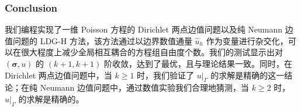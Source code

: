 \subsubsection{Conclusion}

我们编程实现了一维 Poisson 方程的 Dirichlet 两点边值问题以及纯 Neumann 边值问题的 LDG-H 方法，该方法通过以边界数值通量 \(\widehat{u}_{h}\) 作为变量进行杂交化，可以在很大程度上减少全局相互耦合的方程组自由度个数。我们的测试显示出对 \((\bm\sigma, u)\) 的 \((k+1, k+1)\) 阶收敛，达到了最优，且与理论结果一致。同时，在 Dirichlet 两点边值问题中，当 \(k \geqslant 1\) 时，我们验证了 \(u\big|_{\Gamma}\) 的求解是精确的这一结论；在纯 Neumann 边值问题中，通过数值实验我们合理地猜测，当 \(k \geqslant 2\) 时，\(u\big|_{\Gamma}\) 的求解是精确的。
